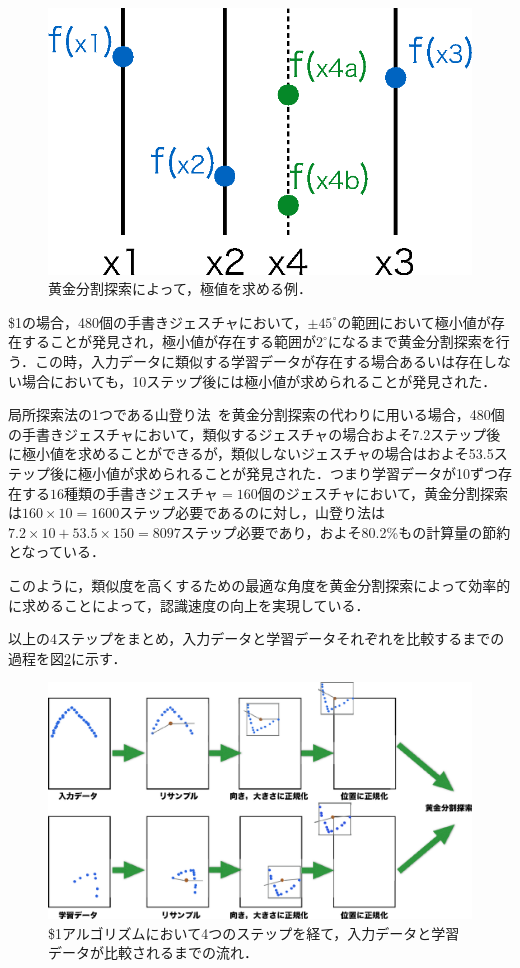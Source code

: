 \begin{figure} [!h]
\centering
\includegraphics [width=0.6\columnwidth]{img/golden.eps}
\caption{黄金分割探索によって，極値を求める例．}
\label{fig:golden}
\end{figure}

\$1の場合，480個の手書きジェスチャにおいて，$\pm45^\circ$の範囲において極小値が存在することが発見され，極小値が存在する範囲が$2^\circ$になるまで黄金分割探索を行う．この時，入力データに類似する学習データが存在する場合あるいは存在しない場合においても，10ステップ後には極小値が求められることが発見された．

局所探索法の1つである山登り法~\cite{Park:2009:SFA:1464526.1465112,Department94prototypeand}を黄金分割探索の代わりに用いる場合，480個の手書きジェスチャにおいて，類似するジェスチャの場合およそ7.2ステップ後に極小値を求めることができるが，類似しないジェスチャの場合はおよそ53.5ステップ後に極小値が求められることが発見された．つまり学習データが10ずつ存在する$16種類の手書きジェスチャ=160$個のジェスチャにおいて，黄金分割探索は$160\times10=1600$ステップ必要であるのに対し，山登り法は$7.2\times10 + 53.5\times150=8097$ステップ必要であり，およそ80.2\%もの計算量の節約となっている．

このように，類似度を高くするための最適な角度を黄金分割探索によって効率的に求めることによって，認識速度の向上を実現している．

以上の4ステップをまとめ，入力データと学習データそれぞれを比較するまでの過程を図\ref{fig:onedoller_flow}に示す．
\begin{figure} [!h]
\centering
\includegraphics [width=0.9\columnwidth]{img/onedoller_flow.eps}
\caption{\$1アルゴリズムにおいて4つのステップを経て，入力データと学習データが比較されるまでの流れ．}
\label{fig:onedoller_flow}
\end{figure}

